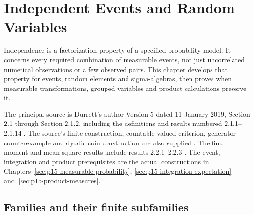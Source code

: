 \chapter{Independent Events and Random Variables}
\label{sec:p15-independent-random-variables}

Independence is a factorization property of a specified probability model.
It concerns every required combination of measurable events, not just
uncorrelated numerical observations or a few observed pairs. This chapter
develops that property for events, random elements and sigma-algebras,
then proves when measurable transformations, grouped variables and product
calculations preserve it.

The principal source is Durrett's author Version 5 dated 11 January 2019,
Section 2.1 through Section 2.1.2, including the definitions and results
numbered 2.1.1--2.1.14 \cite[pp.~43--49]{DurrettPTEAuthor2019}.
The source's finite construction, countable-valued criterion, generator
counterexample and dyadic coin construction are also supplied
\cite[p.~53; exercises~2.1.2, 2.1.6, 2.1.9, 2.1.15]{DurrettPTEAuthor2019}.
The final moment and mean-square results include results 2.2.1--2.2.3
\cite[pp.~56--57]{DurrettPTEAuthor2019}.
The event, integration and product prerequisites are the actual
constructions in Chapters~\ref{sec:p15-measurable-probability},
\ref{sec:p15-integration-expectation} and~\ref{sec:p15-product-measures}.

\section{Families and their finite subfamilies}
\label{sec:p15-independent-families}

